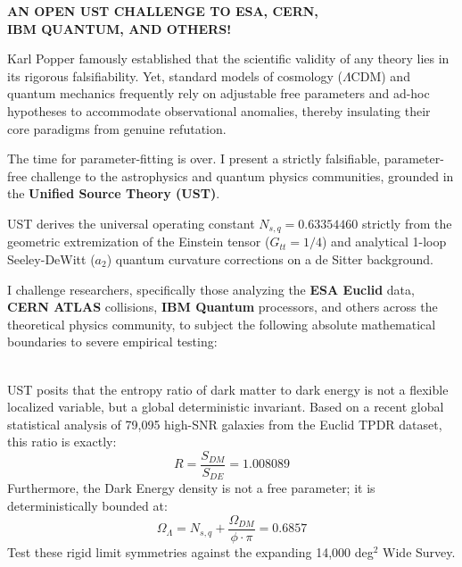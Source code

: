 \documentclass[a4paper,11pt]{article}
\begin{document}
\begin{center}
    \LARGE{\textbf{AN OPEN UST CHALLENGE TO ESA, CERN,}} \\
    \vspace{0.1cm}
    \LARGE{\textbf{IBM QUANTUM, AND OTHERS!}}
\end{center}

\vspace{0.6cm}

\noindent Karl Popper famously established that the scientific validity of any theory lies in its rigorous falsifiability. Yet, standard models of cosmology ($\Lambda$CDM) and quantum mechanics frequently rely on adjustable free parameters and ad-hoc hypotheses to accommodate observational anomalies, thereby insulating their core paradigms from genuine refutation.

\vspace{0.3cm}
\noindent The time for parameter-fitting is over. I present a strictly falsifiable, parameter-free challenge to the astrophysics and quantum physics communities, grounded in the \textbf{Unified Source Theory (UST)}. 

\vspace{0.3cm}
\noindent UST derives the universal operating constant $N_{s,q} = 0.63354460$ strictly from the geometric extremization of the Einstein tensor ($G_{tt} = 1/4$) and analytical 1-loop Seeley-DeWitt ($a_2$) quantum curvature corrections on a de Sitter background. 

\vspace{0.3cm}
\noindent I challenge researchers, specifically those analyzing the \textbf{ESA Euclid} data, \textbf{CERN ATLAS} collisions, \textbf{IBM Quantum} processors, and others across the theoretical physics community, to subject the following absolute mathematical boundaries to severe empirical testing:

\vspace{0.6cm}
 \\
\vspace{0.1cm}
UST posits that the entropy ratio of dark matter to dark energy is not a flexible localized variable, but a global deterministic invariant. Based on a recent global statistical analysis of 79,095 high-SNR galaxies from the Euclid TPDR dataset, this ratio is exactly:
\begin{equation}
R = \frac{S_{DM}}{S_{DE}} = 1.008089
\end{equation}
Furthermore, the Dark Energy density is not a free parameter; it is deterministically bounded at:
\begin{equation}
\Omega_\Lambda = N_{s,q} + \frac{\Omega_{DM}}{\phi \cdot \pi} = 0.6857
\end{equation}
Test these rigid limit symmetries against the expanding 14,000 deg$^2$ Wide Survey.
\end{document}
